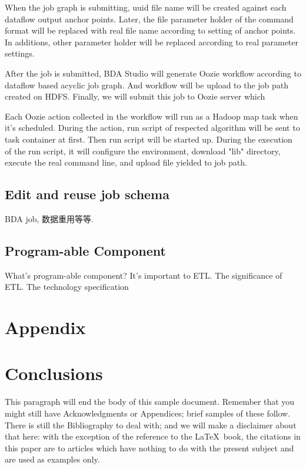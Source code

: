 \documentclass{sig-alternate-05-2015}
\begin{document}
When the job graph is submitting, uuid file name will be created against each dataflow output anchor points. Later, the file parameter holder of the command format will be replaced with real file name according to setting of anchor points. In additions, other parameter holder will be replaced according to real parameter settings.

After the job is submitted, BDA Studio will generate Oozie workflow according to dataflow based acyclic job graph. And workflow will be upload to the job path created on HDFS. Finally, we will submit this job to Oozie server which 

Each Oozie action collected in the workflow will run as a Hadoop map task when it's scheduled. During the action, run script of respected algorithm will be sent to task container at first. Then run script will be started up. During the execution of the run script, it will configure the environment, download "lib" directory, execute the real command line, and upload file yielded to job path.

\subsection{Edit and reuse job schema}
BDA job, 数据重用等等.

\subsection{Program-able Component}
What’s program-able component?
It’s important to ETL. The significance of ETL.
The technology specification 

\section{Appendix}

\section{Conclusions}
This paragraph will end the body of this sample document.
Remember that you might still have Acknowledgments or
Appendices; brief samples of these
follow.  There is still the Bibliography to deal with; and
we will make a disclaimer about that here: with the exception
of the reference to the \LaTeX\ book, the citations in
this paper are to articles which have nothing to
do with the present subject and are used as
examples only.
\end{document}
